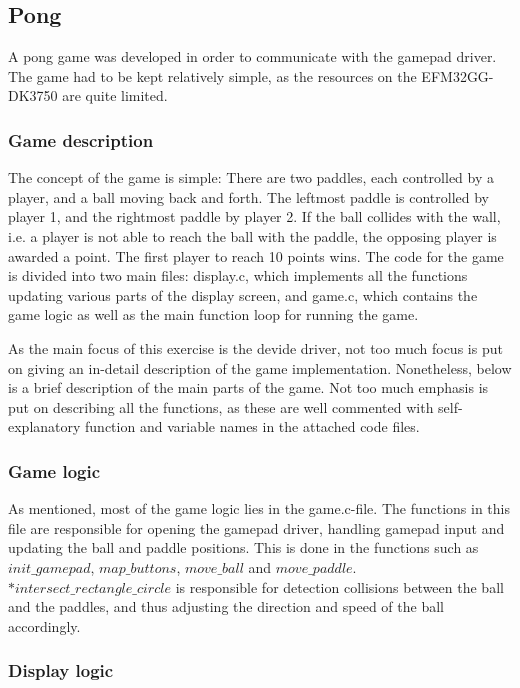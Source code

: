 \subsection{Pong}
A pong game was developed in order to communicate with the gamepad driver. The game had to be kept relatively simple, as the resources on the EFM32GG-DK3750 are quite limited.

\subsubsection{Game description}

The concept of the game is simple: There are two paddles, each controlled by a player, and a ball moving back and forth. The leftmost paddle is controlled by player 1, and the rightmost paddle by player 2. If the ball collides with the wall, i.e. a player is not able to reach the ball with the paddle, the opposing player is awarded a point. The first player to reach 10 points wins. The code for the game is divided into two main files: display.c, which implements all the functions updating various parts of the display screen, and game.c, which contains the game logic as well as the main function loop for running the game.

As the main focus of this exercise is the devide driver, not too much focus is put on giving an in-detail description of the game implementation. Nonetheless, below is a brief description of the main parts of the game. Not too much emphasis is put on describing all the functions, as these are well commented with self-explanatory function and variable names in the attached code files.

\subsubsection{Game logic}

As mentioned, most of the game logic lies in the game.c-file. The functions in this file are responsible for opening the gamepad driver, handling gamepad input and updating the ball and paddle positions. This is done in the functions such as \emph{$init\_gamepad$}, \emph{$map\_buttons$}, \emph{$move\_ball$} and \emph{$move\_paddle$}. \emph{$*intersect\_rectangle\_circle$} is responsible for detection collisions between the ball and the paddles, and thus adjusting the direction and speed of the ball accordingly.

\subsubsection{Display logic}

